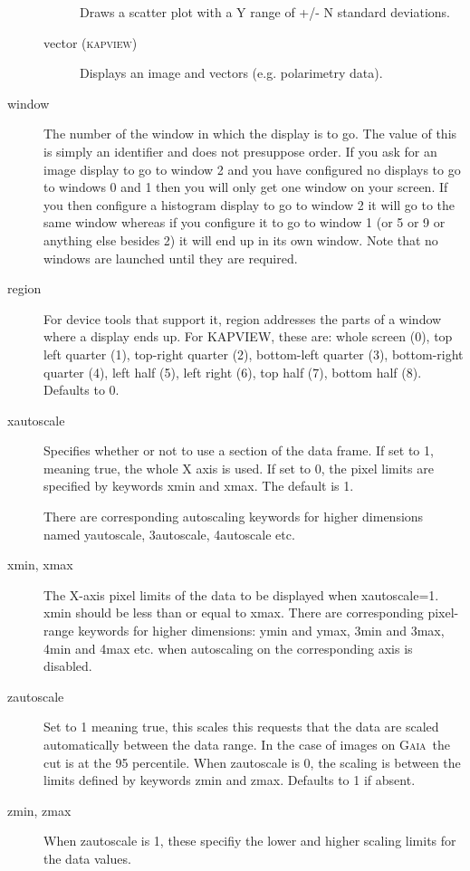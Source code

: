 \documentclass[twoside,11pt]{article}
\newcommand{\xref}[3]{#1}
\renewcommand{\_}{\texttt{\symbol{95}}}
\newcommand{\kapview}{\textsc{kapview}}
\newcommand{\gaia}{\xref{{\textsc{Gaia}}}{sun214}{}}
\begin{document}
\begin{description}
\begin{description}
Draws a scatter plot with a Y range of +/- N standard deviations.

\item[vector (\kapview)] \mbox{}

Displays an image and vectors (e.g. polarimetry data).

\end{description}
\item[window] \mbox{}

The number of the window in which the display is to go. The value of
this is simply an identifier and does not presuppose order. If you ask 
for an image display to go to window 2 and you have configured no
displays to go to windows 0 and 1 then you will only get one window on 
your screen. If you then configure a histogram display to go to window 
2 it will go to the same window whereas if you configure it to go to
window 1 (or 5 or 9 or anything else besides 2) it will end up in its
own window. Note that no windows are launched until they are
required.

\item[region] \mbox{}

For device tools that support it, region addresses the parts of a
window where a display ends up. For KAPVIEW, these are: whole screen
(0), top left quarter (1), top-right quarter (2), bottom-left quarter
(3), bottom-right quarter (4), left half (5), left right (6), top half 
(7), bottom half (8).  Defaults to 0.

\item[xautoscale] \mbox{}

Specifies whether or not to use a section of the data frame.  If set to
1, meaning true, the whole X axis is used.  If set to 0, the pixel limits
are specified by keywords xmin and xmax.  The default is 1.



There are corresponding autoscaling keywords for higher dimensions
named yautoscale, 3autoscale, 4autoscale etc.

\item[xmin, xmax] \mbox{}

The X-axis pixel limits of the data to be displayed when xautoscale=1.
xmin should be less than or equal to xmax.  There are corresponding
pixel-range keywords for higher dimensions: ymin and ymax, 3min and
3max, 4min and 4max etc. when autoscaling on the corresponding axis is
disabled.

\item[zautoscale] \mbox{}

Set to 1 meaning true, this scales this requests that the data are
scaled automatically between the data range.  In the case of images on
\gaia\ the cut is at the 95 percentile.  When zautoscale is 0, the
scaling is between the limits defined by keywords zmin and zmax.
Defaults to 1 if absent.

\item[zmin, zmax] \mbox{}

When zautoscale is 1, these specifiy the lower and higher 
scaling limits for the data values.

\end{description}
\end{document}

